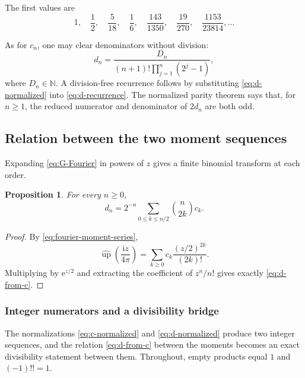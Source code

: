\documentclass[11pt,oneside]{article}
\newtheorem{proposition}[theorem]{Proposition}
\theoremstyle{definition}
\theoremstyle{remark}
\newcommand{\N}{\mathbb N}
\newcommand{\Up}{\operatorname{up}}
\newcommand{\e}{\mathrm e}
\newcommand{\ii}{\mathrm i}
\begin{document}
The first values are
\begin{equation}
 1,\quad\frac12,\quad\frac5{18},\quad\frac16,\quad
 \frac{143}{1350},\quad\frac{19}{270},\quad
 \frac{1153}{23814},\ldots                                \label{eq:d-first-values}
\end{equation}

As for $c_n$, one may clear denominators without division:
\begin{equation}
 d_n=\frac{D_n}{(n+1)!\prod_{j=1}^{n}(2^j-1)},             \label{eq:d-normalized}
\end{equation}
where $D_n\in\N$.  A division-free recurrence follows by substituting
\eqref{eq:d-normalized} into \eqref{eq:d-recurrence}.  The normalized parity theorem says
that, for $n\ge1$, the reduced numerator and denominator of $2d_n$ are both odd.

\subsection{Relation between the two moment sequences}

Expanding \eqref{eq:G-Fourier} in powers of $z$ gives a finite binomial transform at each
order.

\begin{proposition}
For every $n\ge0$,
\begin{equation}
 d_n=2^{-n}\sum_{0\le k\le n/2}\binom{n}{2k}c_k.           \label{eq:d-from-c}
\end{equation}
\end{proposition}

\begin{proof}
By \eqref{eq:fourier-moment-series},
\begin{equation*}
 \widehat{\Up}\!\left(\frac{\ii z}{4\pi}\right)
 =\sum_{k\ge0}c_k\frac{(z/2)^{2k}}{(2k)!}.
\end{equation*}
Multiplying by $\e^{z/2}$ and extracting the coefficient of $z^n/n!$ gives exactly
\eqref{eq:d-from-c}.
\end{proof}

\subsubsection{Integer numerators and a divisibility bridge}

The normalizations \eqref{eq:c-normalized} and \eqref{eq:d-normalized} produce two integer
sequences, and the relation \eqref{eq:d-from-c} between the moments becomes an exact
divisibility statement between them.  Throughout, empty products equal $1$ and
$(-1)!!=1$.
\end{document}
